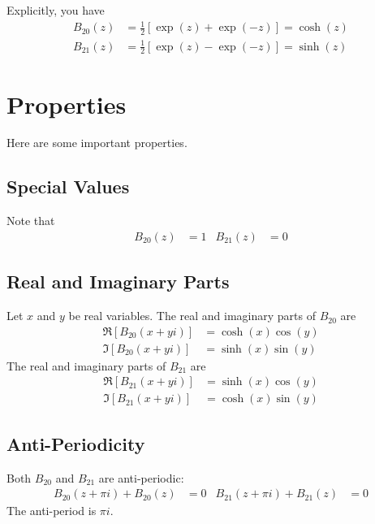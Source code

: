 Explicitly, you have
\begin{align}
    B_{20}(z) &= \frac{1}{2} \left[ \exp(z) + \exp(-z) \right] = \cosh(z) \\
    B_{21}(z) &= \frac{1}{2} \left[ \exp(z) - \exp(-z) \right] = \sinh(z)
\end{align}
\section{Properties}
Here are some important properties.
\subsection{Special Values}
Note that
\begin{align}
    B_{20}(z) &= 1 & B_{21}(z) &= 0
\end{align}
\subsection{Real and Imaginary Parts}
Let $x$ and $y$ be real variables. The real and imaginary parts of $B_{20}$ are
\begin{align}
    \Re\left[ B_{20}(x + yi) \right] &= \cosh(x) \cos(y) \\
    \Im\left[ B_{20}(x + yi) \right] &= \sinh(x) \sin(y)
\end{align}
The real and imaginary parts of $B_{21}$ are
\begin{align}
    \Re\left[ B_{21}(x + yi) \right] &= \sinh(x) \cos(y) \\
    \Im\left[ B_{21}(x + yi) \right] &= \cosh(x) \sin(y)
\end{align}
\subsection{Anti-Periodicity}
Both $B_{20}$ and $B_{21}$ are anti-periodic:
\begin{align}
    B_{20}(z + \pi i) + B_{20}(z) &= 0 & B_{21}(z + \pi i) + B_{21}(z) &= 0
\end{align}
The anti-period is $\pi i$.
